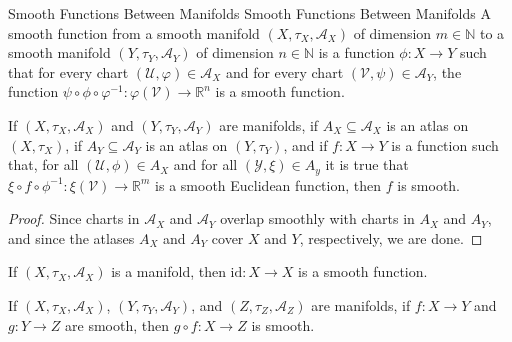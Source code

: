\documentclass[oneside]{book}                                                  %
\begin{document}
                \begin{fdefinition}{Smooth Functions Between Manifolds}
                                   {Smooth Functions Between Manifolds}
                    A smooth function from a smooth manifold
                    $(X,\tau_{X},\mathcal{A}_{X})$ of dimension $m\in\mathbb{N}$
                    to a smooth manifold $(Y,\tau_{Y},\mathcal{A}_{Y})$ of
                    dimension $n\in\mathbb{N}$ is a function
                    $\phi:X\rightarrow{Y}$ such that for every chart
                    $(\mathcal{U},\varphi)\in\mathcal{A}_{X}$ and for every
                    chart $(\mathcal{V},\psi)\in\mathcal{A}_{Y}$, the function
                    $\psi\circ\phi\circ\varphi^{\minus{1}}:\varphi(\mathcal{V})%
                     \rightarrow\mathbb{R}^{n}$ is a smooth function.
                \end{fdefinition}
                \begin{theorem}
                    If $(X,\tau_{X},\mathcal{A}_{X})$ and
                    $(Y,\tau_{Y},\mathcal{A}_{Y})$ are manifolds, if
                    $A_{X}\subseteq\mathcal{A}_{X}$ is an atlas on $(X,\tau_{X})$,
                    if $A_{Y}\subseteq\mathcal{A}_{Y}$ is an atlas on
                    $(Y,\tau_{Y})$, and if $f:X\rightarrow{Y}$ is a function such
                    that, for all $(\mathcal{U},\phi)\in{A}_{X}$ and for all
                    $(\mathcal{Y},\xi)\in{A}_{y}$ it is true that
                    $\xi\circ{f}\circ\phi^{\minus{1}}:\xi(\mathcal{V})%
                     \rightarrow\mathbb{R}^{m}$ is a smooth Euclidean function,
                    then $f$ is smooth.
                \end{theorem}
                \begin{proof}
                    Since charts in $\mathcal{A}_{X}$ and $\mathcal{A}_{Y}$
                    overlap smoothly with charts in $A_{X}$ and $A_{Y}$, and since
                    the atlases $A_{X}$ and $A_{Y}$ cover $X$ and $Y$, respectively,
                    we are done.
                \end{proof}
                \begin{theorem}
                    If $(X,\tau_{X},\mathcal{A}_{X})$ is a manifold, then
                    $\textrm{id}:X\rightarrow{X}$ is a smooth function.
                \end{theorem}
                \begin{theorem}
                    If $(X,\tau_{X},\mathcal{A}_{X})$,
                    $(Y,\tau_{Y},\mathcal{A}_{Y})$, and
                    $(Z,\tau_{Z},\mathcal{A}_{Z})$ are manifolds, if
                    $f:X\rightarrow{Y}$ and $g:Y\rightarrow{Z}$ are smooth, then
                    $g\circ{f}:X\rightarrow{Z}$ is smooth.
                \end{theorem}
\end{document}
